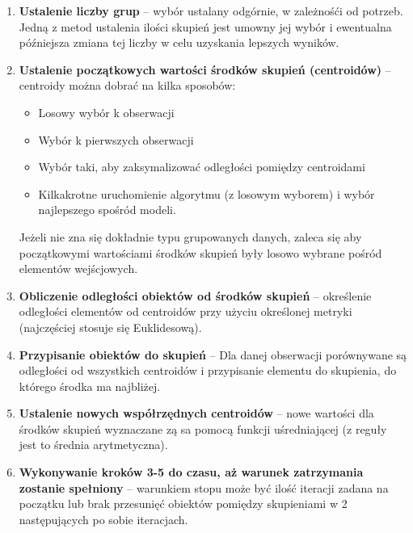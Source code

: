 \begin{enumerate}
	\item \textbf{Ustalenie liczby grup} -- wybór ustalany odgórnie, w zależnośći od potrzeb. Jedną z metod ustalenia ilości skupień jest umowny jej wybór i ewentualna późniejsza zmiana tej liczby w celu uzyskania lepszych wyników.
	\item \textbf{Ustalenie początkowych wartości środków skupień (centroidów)} -- centroidy można dobrać na kilka sposobów:
	\begin{itemize}
		\item Losowy wybór k obserwacji
		\item Wybór k pierwszych obserwacji
		\item Wybór taki, aby zaksymalizować odległości pomiędzy centroidami
		\item Kilkakrotne uruchomienie algorytmu (z losowym wyborem) i wybór najlepszego spośród modeli.
	\end{itemize}
		Jeżeli nie zna się dokładnie typu grupowanych danych, zaleca się aby początkowymi wartościami środków skupień były losowo wybrane pośród elementów wejścjowych.
	\item \textbf{Obliczenie odległości obiektów od środków skupień} -- określenie odległości elementów od centroidów przy użyciu określonej metryki (najczęściej stosuje się Euklidesową).
	\item \textbf{Przypisanie obiektów do skupień} -- Dla danej obserwacji porównywane są odległości od wszystkich centroidów i przypisanie elementu do skupienia, do którego środka ma najbliżej.
	\item \textbf{Ustalenie nowych współrzędnych centroidów} -- nowe wartości dla środków skupień wyznaczane zą sa pomocą funkcji uśredniającej (z reguły jest to średnia arytmetyczna).
	\item \textbf{Wykonywanie kroków 3-5 do czasu, aż warunek zatrzymania zostanie spełniony} -- warunkiem stopu może być ilość iteracji zadana na początku lub brak przesunięć obiektów pomiędzy skupieniami w 2 następujących po sobie iteracjach.
\end{enumerate}